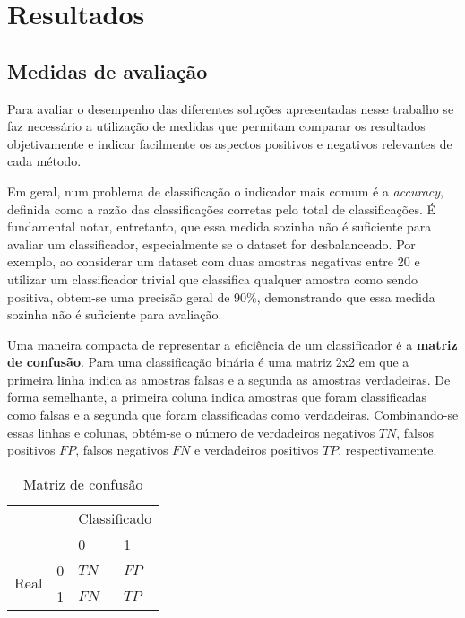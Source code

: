 \chapter{Resultados}

\section{Medidas de avaliação}
Para avaliar o desempenho das diferentes soluções apresentadas nesse trabalho se faz necessário a utilização de medidas que permitam comparar os resultados objetivamente e indicar facilmente os aspectos positivos e negativos relevantes de cada método. 

Em geral, num problema de classificação o indicador mais comum é a \textit{accuracy}, definida como a razão das classificações corretas pelo total de classificações. É fundamental notar, entretanto, que essa medida sozinha não é suficiente para avaliar um classificador, especialmente se o dataset for desbalanceado. Por exemplo, ao considerar um dataset com duas amostras negativas entre 20 e utilizar um classificador trivial que classifica qualquer amostra como sendo positiva, obtem-se uma precisão geral de 90\%, demonstrando que essa medida sozinha não é suficiente para avaliação.

Uma maneira compacta de representar a eficiência de um classificador é a \textbf{matriz de confusão}. Para uma classificação binária é uma matriz 2x2 em que a primeira linha indica as amostras falsas e a segunda as amostras verdadeiras. De forma semelhante, a primeira coluna indica amostras que foram classificadas como falsas e a segunda que foram classificadas como verdadeiras. Combinando-se essas linhas e colunas, obtém-se o número de verdadeiros negativos $TN$, falsos positivos $FP$, falsos negativos $FN$ e verdadeiros positivos $TP$, respectivamente.

\begin{table}[h]
\centering
\caption{Matriz de confusão}
\label{tab:matriz-confusão}
\begin{tabular}{ll|l|l|}
\cline{3-4}
                                            &   & \multicolumn{2}{l|}{Classificado} \\ \cline{3-4} 
                                            &   & 0               & 1               \\ \hline
\multicolumn{1}{|l|}{\multirow{2}{*}{Real}} & 0 & $TN$              & $FP$              \\ \cline{2-4} 
\multicolumn{1}{|l|}{}                      & 1 & $FN$              & $TP$              \\ \hline
\end{tabular}
\end{table}

